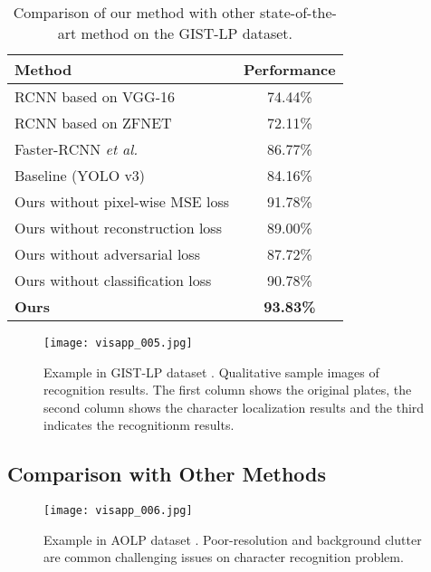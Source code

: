 \documentclass[a4paper,twoside]{article}
\begin{document}
\setlength{\tabcolsep}{10pt}
    \begin{table*}
    \begin{center}
    \caption{Comparison of our method with other state-of-the-art method on the GIST-LP dataset.}
    \label{table:headings}
    \begin{tabular}{l|c}
    \hline
    Method & Performance \\
    \hline\hline
    \noalign{\smallskip}
    RCNN based on VGG-16 \cite{girshick2014rich} & 74.44\% \\ RCNN based on ZFNET \cite{girshick2014rich} & 72.11\% \\  Faster-RCNN \textit{et al.} \cite{ren2015faster} & 86.77\% \\ \hline\hline Baseline (YOLO v3) \cite{redmon2018yolov3} & 84.16\% \\ Ours without pixel-wise MSE loss & 91.78\% \\ Ours without reconstruction loss & 89.00\% \\ Ours without adversarial loss & 87.72\% \\ Ours without classification loss & 90.78\% \\ \textbf{Ours} & \textbf{93.83\%} \\ \hline
    \end{tabular}
    \end{center}
    \end{table*}
    \setlength{\tabcolsep}{1.4pt} 
    
\begin{figure}[t]
    \begin{center}
\texttt{[image: visapp\_005.jpg]}
    \end{center}
       \caption{Example in GIST-LP dataset \cite{laroca2018robust}. Qualitative sample images of recognition results. The first column shows the original plates, the second column shows the character localization results and the third indicates the recognitionm results.}
    \label{fig:long}
    \label{fig:onecol}
    \end{figure}

\subsection{Comparison with Other Methods}


\begin{figure*}[t]
    \begin{center}
\texttt{[image: visapp\_006.jpg]}
    \end{center}
       \caption{Example in AOLP dataset \cite{hsu2013application}. Poor-resolution and background clutter are common challenging issues on character recognition problem.}
    \label{fig:long}
    \label{fig:onecol}
    \end{figure*}
    
\end{document}
